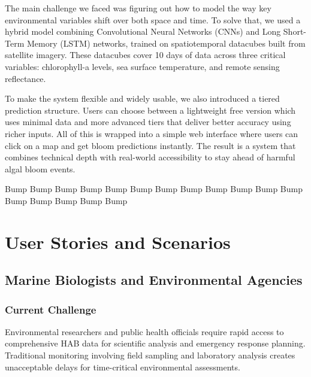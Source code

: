 \documentclass[conference]{IEEEtran}
\begin{document}
The main challenge we faced was figuring out how to model the way key environmental variables shift over both space and time. To solve that, we used a hybrid model combining Convolutional Neural Networks (CNNs) and Long Short-Term Memory (LSTM) networks, trained on spatiotemporal datacubes built from satellite imagery. These datacubes cover 10 days of data across three critical variables: chlorophyll-a levels, sea surface temperature, and remote sensing reflectance.

To make the system flexible and widely usable, we also introduced a tiered prediction structure. Users can choose between a lightweight free version which uses minimal data and more advanced tiers that deliver better accuracy using richer inputs. All of this is wrapped into a simple web interface where users can click on a map and get bloom predictions instantly. The result is a system that combines technical depth with real-world accessibility to stay ahead of harmful algal bloom events.

Bump
\newline
Bump
\newline
Bump
\newline
Bump
\newline
Bump
\newline
Bump
\newline
Bump
\newline
Bump
\newline
Bump
\newline
Bump
\newline
Bump
\newline
Bump
\newline
Bump
\newline
Bump
\newline
Bump
\newline
Bump
\newline
Bump

\section{User Stories and Scenarios}

\subsection{Marine Biologists and Environmental Agencies}
\subsubsection{Current Challenge}
Environmental researchers and public health officials require rapid access to comprehensive HAB data for scientific analysis and emergency response planning. Traditional monitoring involving field sampling and laboratory analysis creates unacceptable delays for time-critical environmental assessments.
\end{document}
